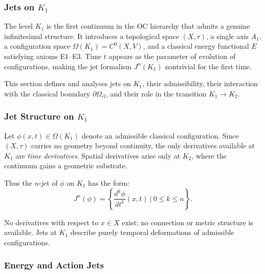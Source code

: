 
\subsubsection{Jets on \texorpdfstring{$K_1$}{K_1}}
\label{sec:jets-k1}

The level $K_1$ is the first continuum in the OC hierarchy that admits
a genuine infinitesimal structure. It introduces a topological space
$(X,\tau)$, a single axis $A_1$, a configuration space
$\Omega(K_1)=C^0(X,V)$, and a classical energy functional $E$ satisfying
axioms E1--E3. Time $t$ appears as the parameter of evolution of
configurations, making the jet formalism $J^n(K_1)$ nontrivial for the
first time.

This section defines and analyses jets on $K_1$, their admissibility,
their interaction with the classical boundary $\partial\Omega_{\mathrm{cl}}$,
and their role in the transition $K_1\to K_2$.



\subsubsection{Jet Structure on \texorpdfstring{\texorpdfstring{$K_1$}{K_1}}{K1}}

Let $\phi(x,t)\in\Omega(K_1)$ denote an admissible classical
configuration. Since $(X,\tau)$ carries no geometry beyond continuity,
the only derivatives available at $K_1$ are \emph{time derivatives}.
Spatial derivatives arise only at $K_2$, where the continuum gains a
geometric substrate.

Thus the $n$-jet of $\phi$ on $K_1$ has the form:
\[
J^n(\phi)
=
\left\{
\frac{d^k\phi}{dt^k}(x,t)
\ \bigg|\
0 \le k \le n
\right\}.
\]

No derivatives with respect to $x\in X$ exist; no connection or metric
structure is available. Jets at $K_1$ describe purely temporal
deformations of admissible configurations.



\subsubsection{Energy and Action Jets}


